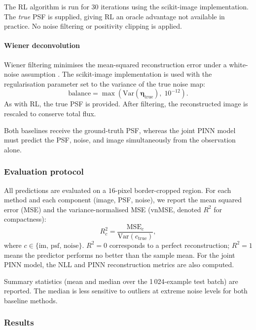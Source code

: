 \documentclass{aa}
\begin{document}
The RL algorithm \citep{1972JOSA...62...55R, 1974AJ.....79..745L} is run for 30 iterations using the scikit-image implementation. The \emph{true} PSF is supplied, giving RL an oracle advantage not available in practice. No noise filtering or positivity clipping is applied.

\paragraph{Wiener deconvolution}

Wiener filtering minimises the mean-squared reconstruction error under a white-noise assumption \citep{1949wiener}. The scikit-image implementation is used with the regularisation parameter set to the variance of the true noise map:
\begin{equation}
\mathrm{balance} = \max\!\left(\mathrm{Var}(\boldsymbol{\eta}_\mathrm{true}),\; 10^{-12}\right).
\end{equation}
As with RL, the true PSF is provided. After filtering, the reconstructed image is rescaled to conserve total flux.

Both baselines receive the ground-truth PSF, whereas the joint PINN model must predict the PSF, noise, and image simultaneously from the observation alone.

\subsubsection{Evaluation protocol}

All predictions are evaluated on a $16$-pixel border-cropped region. For each method and each component (image, PSF, noise), we report the mean squared error (MSE) and the variance-normalised MSE (vnMSE, denoted $R^2$ for compactness):
\begin{equation}
R^2_c = \frac{\mathrm{MSE}_c}{\mathrm{Var}(c_\mathrm{true})},
\end{equation}
where $c \in \{\mathrm{im},\, \mathrm{psf},\, \mathrm{noise}\}$. $R^2 = 0$ corresponds to a perfect reconstruction; $R^2 = 1$ means the predictor performs no better than the sample mean. For the joint PINN model, the NLL and PINN reconstruction metrics are also computed.

Summary statistics (mean and median over the 1\,024-example test batch) are reported. The median is less sensitive to outliers at extreme noise levels for both baseline methods.

\subsubsection{Results}
\end{document}
